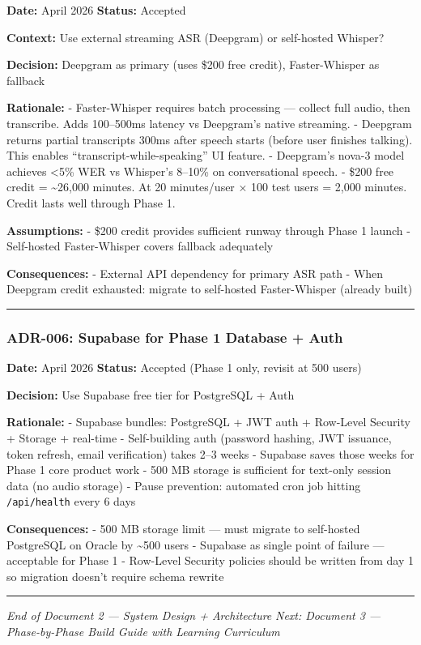 \documentclass[
  11pt,
]{article}
\newcommand{\passthrough}[1]{#1}
\begin{document}
\textbf{Date:} April 2026 \textbar{} \textbf{Status:} Accepted

\textbf{Context:} Use external streaming ASR (Deepgram) or self-hosted
Whisper?

\textbf{Decision:} Deepgram as primary (uses \$200 free credit),
Faster-Whisper as fallback

\textbf{Rationale:} - Faster-Whisper requires batch processing ---
collect full audio, then transcribe. Adds 100--500ms latency vs
Deepgram's native streaming. - Deepgram returns partial transcripts
300ms after speech starts (before user finishes talking). This enables
``transcript-while-speaking'' UI feature. - Deepgram's nova-3 model
achieves \textless5\% WER vs Whisper's 8--10\% on conversational speech.
- \$200 free credit = \textasciitilde26,000 minutes. At 20 minutes/user
× 100 test users = 2,000 minutes. Credit lasts well through Phase 1.

\textbf{Assumptions:} - \$200 credit provides sufficient runway through
Phase 1 launch - Self-hosted Faster-Whisper covers fallback adequately

\textbf{Consequences:} - External API dependency for primary ASR path -
When Deepgram credit exhausted: migrate to self-hosted Faster-Whisper
(already built)

\begin{center}\rule{0.5\linewidth}{0.5pt}\end{center}

\hypertarget{adr-006-supabase-for-phase-1-database-auth}{%
\subsubsection{ADR-006: Supabase for Phase 1 Database +
Auth}\label{adr-006-supabase-for-phase-1-database-auth}}

\textbf{Date:} April 2026 \textbar{} \textbf{Status:} Accepted (Phase 1
only, revisit at 500 users)

\textbf{Decision:} Use Supabase free tier for PostgreSQL + Auth

\textbf{Rationale:} - Supabase bundles: PostgreSQL + JWT auth +
Row-Level Security + Storage + real-time - Self-building auth (password
hashing, JWT issuance, token refresh, email verification) takes 2--3
weeks - Supabase saves those weeks for Phase 1 core product work - 500
MB storage is sufficient for text-only session data (no audio storage) -
Pause prevention: automated cron job hitting
\passthrough{\lstinline!/api/health!} every 6 days

\textbf{Consequences:} - 500 MB storage limit --- must migrate to
self-hosted PostgreSQL on Oracle by \textasciitilde500 users - Supabase
as single point of failure --- acceptable for Phase 1 - Row-Level
Security policies should be written from day 1 so migration doesn't
require schema rewrite

\begin{center}\rule{0.5\linewidth}{0.5pt}\end{center}

\emph{End of Document 2 --- System Design + Architecture} \emph{Next:
Document 3 --- Phase-by-Phase Build Guide with Learning Curriculum}
\end{document}
